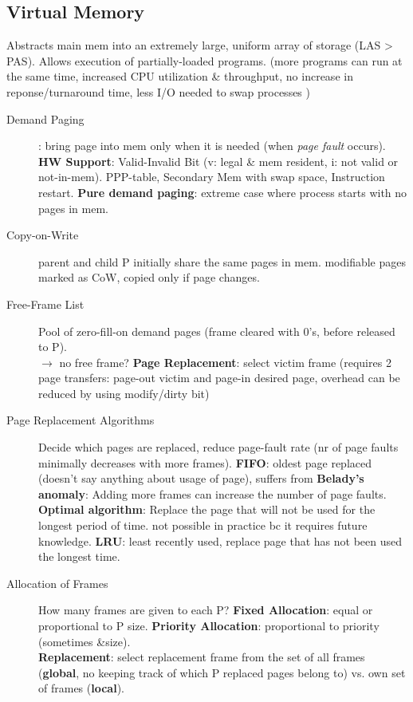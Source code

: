 \subsection*{Virtual Memory}
Abstracts main mem into an extremely large, uniform array of storage (LAS > PAS). Allows execution of partially-loaded programs. (more programs can run at the same time, increased CPU utilization \& throughput, no increase in reponse/turnaround time, less I/O needed to swap processes )
\begin{description}
    \item[Demand Paging]: bring page into mem only when it is needed (when \textit{page fault} occurs). \textbf{HW Support}: Valid-Invalid Bit (v: legal & mem resident, i: not valid or not-in-mem). PPP-table, Secondary Mem with swap space, Instruction restart. \textbf{Pure demand paging}: extreme case where process starts with no pages in mem.
    \item[Copy-on-Write]parent and child P initially share the same pages in mem. modifiable pages marked as CoW, copied only if page changes.
    \item[Free-Frame List]Pool of zero-fill-on demand pages (frame cleared with 0's, before released to P). \\
    $\rightarrow$ no free frame? \textbf{Page Replacement}: select victim frame (requires 2 page transfers: page-out victim and page-in desired page, overhead can be reduced by using modify/dirty bit) %
    \item[Page Replacement Algorithms] Decide which pages are replaced, reduce page-fault rate (nr of page faults minimally decreases with more frames). \textbf{FIFO}: oldest page replaced (doesn't say anything about usage of page), suffers from \textbf{Belady's anomaly}: Adding more frames can increase the number of page faults. \textbf{Optimal algorithm}: Replace the page that will not be used for the longest period of time. not possible in practice bc it  requires future knowledge. \textbf{LRU}: least recently used, replace page that has not been used the longest time.
    \item[Allocation of Frames]How many frames are given to each P? \textbf{Fixed Allocation}: equal or proportional to P size. \textbf{Priority Allocation}: proportional to priority (sometimes &size). \\
        \textbf{Replacement}: select replacement frame from the set of all frames (\textbf{global}, no keeping track of which P replaced pages belong to) vs. own set of frames (\textbf{local}).

\end{description}
